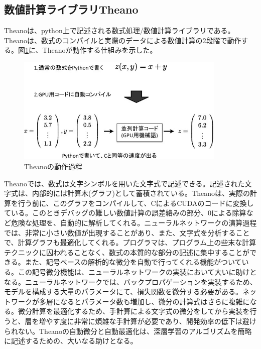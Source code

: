 \subsection{数値計算ライブラリTheano}
Theanoは、python上で記述される数式処理/数値計算ライブラリである。Theanoは、数式のコンパイルと実際のデータによる数値計算の2段階で動作する\cite{bergstra2010theano:}。図\ref{c4_Theano_compile}に、Theanoが動作する仕組みを示した。
\begin{figure}[tbp]
 \centering
  \includegraphics[width=100mm]{img/c4/theano_compile}
 \caption{Theanoの動作過程}
 \label{c4_Theano_compile}
\end{figure}
Theanoでは、数式は文字シンボルを用いた文字式で記述できる。記述された文字式は、内部的には計算木(グラフ)として蓄積されている。Theanoは、実際の計算を行う前に、このグラフをコンパイルして、CによるCUDAのコードに変換している。このときデバッグの難しい数値計算の誤差絡みの部分、0による除算など危険な処理を、自動的に解析してくれる。ニューラルネットワークの演算過程では、非常に小さい数値が出現することがあり、また、文字式を分析することで、計算グラフも最適化してくれる。プログラマは、プログラム上の些末な計算テクニックに囚われることなく、数式の本質的な部分の記述に集中することができる。また、記号ベースの解析的な微分を自動で行ってくれる機能がついている。この記号微分機能は、ニューラルネットワークの実装において大いに助けとなる。ニューラルネットワークでは、バックプロパゲーションを実装するため、モデルを構成する大量のパラメータにて、損失関数を微分する必要がある。ネットワークが多層になるとパラメータ数も増加し、微分の計算式はさらに複雑になる。微分計算を最適化するため、手計算による文字式の微分をしてから実装を行うと、層を増やす度に非常に煩雑な手計算が必要であり、開発効率の低下は避けられない。Theanoの自動微分と自動最適化は、深層学習のアルゴリズムを簡略に記述するための、大いなる助けとなる。

